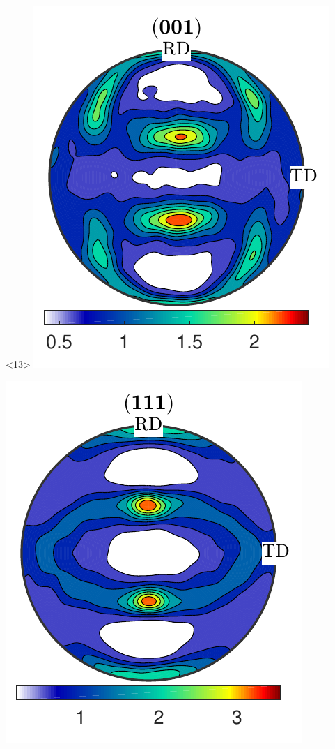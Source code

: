 \documentclass[compress]{beamer}
\begin{document}
\begin{frame}[fragile]
\begin{columns}
\begin{column}{0.29\textwidth}
                        \begin{onlyenv}<13>
        \includegraphics[width=\textwidth]{pic/rolling001_10}

      \includegraphics[width=\textwidth]{pic/rolling111_10}
    \end{onlyenv}


\end{column}
\end{columns}
\end{frame}
\end{document}

